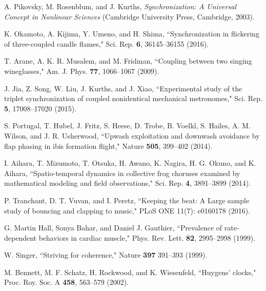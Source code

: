 \documentclass[preprint,showpacs,preprintnumbers,amsmath,amssymb,aps,prb]{revtex4-1}
\theoremstyle{remark}
\begin{document}
\begin{thebibliography}{99}

 A. Pikovsky, M. Rosenblum, and J. Kurths, {\it Synchronization: A Universal Concept in Nonlinear Sciences} (Cambridge University Press, Cambridge, 2003).
  
 K. Okamoto, A. Kijima, Y. Umeno, and H. Shima, ``Synchronization in flickering of three-coupled candle flames," Sci. Rep. {\bf 6}, 36145--36155 (2016).

 T. Arane, A. K. R. Musalem, and M. Fridman, ``Coupling between two singing wineglasses," Am. J. Phys. {\bf 77}, 1066--1067 (2009). %
  
  J. Jia, Z. Song, W. Liu, J. Kurths, and J. Xiao, ``Experimental study of the triplet synchronization of coupled nonidentical mechanical metronomes," Sci. Rep. {\bf 5}, 17008--17020 (2015).

  
 S. Portugal, T. Hubel, J. Fritz, S. Heese, D. Trobe, B. Voelkl, S. Hailes, A. M. Wilson, and J. R. Usherwood,   ``Upwash exploitation and downwash avoidance by flap phasing in ibis formation flight," Nature {\bf 505}, 399--402 (2014).

   I. Aihara, T. Mizumoto, T. Otsuka, H. Awano, K. Nagira, H. G. Okuno, and K. Aihara, ``Spatio-temporal dynamics in collective frog choruses examined by mathematical modeling and field observations," Sci. Rep. {\bf 4}, 3891--3899 (2014). 

   P. Tranchant, D. T. Vuvan, and I. Peretz, ``Keeping the beat: A Large sample study of bouncing and clapping to music," PLoS ONE 11(7): e0160178 (2016).

   G. Martin Hall, Sonya Bahar, and Daniel J. Gauthier, ``Prevalence of rate-dependent behaviors in cardiac muscle," Phys. Rev. Lett. {\bf 82}, 2995--2998 (1999).

   W. Singer, ``Striving for coherence,"  Nature {\bf 397} 391--393 (1999).

   M. Bennett, M. F. Schatz, H. Rockwood, and K. Wiesenfeld, ``Huygens' clocks," Proc. Roy. Soc. A {\bf 458}, 563--579 (2002).


\end{thebibliography}
\end{document}

